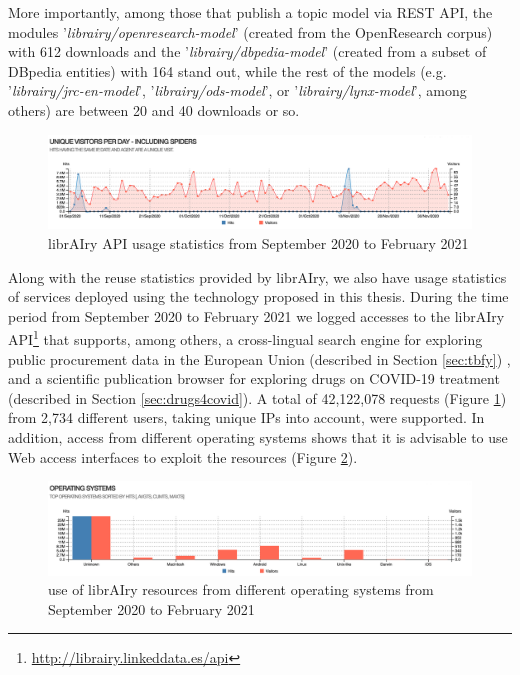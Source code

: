 More importantly, among those that publish a topic model via REST API, the modules '\textit{librairy/openresearch-model}' (created from the OpenResearch corpus) with 612 downloads and the '\textit{librairy/dbpedia-model}' (created from a subset of DBpedia entities) with 164 stand out, while the rest of the models (e.g. '\textit{librairy/jrc-en-model}', '\textit{librairy/ods-model}',  or '\textit{librairy/lynx-model}', among others) are between 20 and 40 downloads or so. 

\begin{figure}[ht]
    \centering
    \includegraphics[width=\linewidth]{usage-statistics.png}
    \caption{librAIry API usage statistics from September 2020 to February 2021}
    \label{fig:api-usage}
\end{figure}


Along with the reuse statistics provided by librAIry, we also have usage statistics of services deployed using the technology proposed in this thesis. During the time period from September 2020 to February 2021 we logged accesses to the librAIry API\footnote{\url{http://librairy.linkeddata.es/api}} that supports, among others, a cross-lingual search engine for exploring public procurement data in the European Union (described in Section \ref{sec:tbfy}) , and a scientific publication browser for exploring drugs on COVID-19 treatment  (described in Section \ref{sec:drugs4covid}).  A total of 42,122,078 requests (Figure \ref{fig:api-usage}) from 2,734 different users, taking unique IPs into account, were supported. In addition, access from different operating systems shows that it is advisable to use Web access interfaces to exploit the resources (Figure \ref{fig:so-usage}).


\begin{figure}[ht]
    \centering
    \includegraphics[width=\linewidth]{so-statistics.png}
    \caption{use of librAIry resources from different operating systems from September 2020 to February 2021}
    \label{fig:so-usage}
\end{figure}



